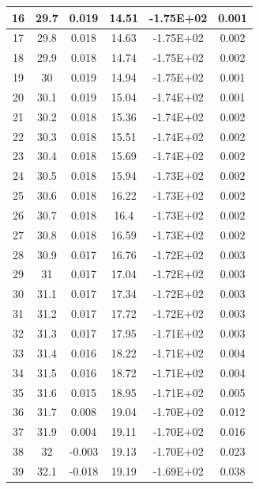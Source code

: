 \documentclass{THUexprep}
\begin{document}
\begin{longtable}{|c|c|c|c|c|c|}
    \hline
    16    & 29.7  & 0.019 & 14.51 & -1.75E+02 & 0.001 \\
    \hline
    17    & 29.8  & 0.018 & 14.63 & -1.75E+02 & 0.002 \\
    \hline
    18    & 29.9  & 0.018 & 14.74 & -1.75E+02 & 0.002 \\
    \hline
    19    & 30    & 0.019 & 14.94 & -1.75E+02 & 0.001 \\
    \hline
    20    & 30.1  & 0.019 & 15.04 & -1.74E+02 & 0.001 \\
    \hline
    21    & 30.2  & 0.018 & 15.36 & -1.74E+02 & 0.002 \\
    \hline
    22    & 30.3  & 0.018 & 15.51 & -1.74E+02 & 0.002 \\
    \hline
    23    & 30.4  & 0.018 & 15.69 & -1.74E+02 & 0.002 \\
    \hline
    24    & 30.5  & 0.018 & 15.94 & -1.73E+02 & 0.002 \\
    \hline
    25    & 30.6  & 0.018 & 16.22 & -1.73E+02 & 0.002 \\
    \hline
    26    & 30.7  & 0.018 & 16.4  & -1.73E+02 & 0.002 \\
    \hline
    27    & 30.8  & 0.018 & 16.59 & -1.73E+02 & 0.002 \\
    \hline
    28    & 30.9  & 0.017 & 16.76 & -1.72E+02 & 0.003 \\
    \hline
    29    & 31    & 0.017 & 17.04 & -1.72E+02 & 0.003 \\
    \hline
    30    & 31.1  & 0.017 & 17.34 & -1.72E+02 & 0.003 \\
    \hline
    31    & 31.2  & 0.017 & 17.72 & -1.72E+02 & 0.003 \\
    \hline
    32    & 31.3  & 0.017 & 17.95 & -1.71E+02 & 0.003 \\
    \hline
    33    & 31.4  & 0.016 & 18.22 & -1.71E+02 & 0.004 \\
    \hline
    34    & 31.5  & 0.016 & 18.72 & -1.71E+02 & 0.004 \\
    \hline
    35    & 31.6  & 0.015 & 18.95 & -1.71E+02 & 0.005 \\
    \hline
    36    & 31.7  & 0.008 & 19.04 & -1.70E+02 & 0.012 \\
    \hline
    37    & 31.9  & 0.004 & 19.11 & -1.70E+02 & 0.016 \\
    \hline
    38    & 32    & -0.003 & 19.13 & -1.70E+02 & 0.023 \\
    \hline
    39    & 32.1  & -0.018 & 19.19 & -1.69E+02 & 0.038 \\
    \hline

\end{longtable}
\end{document}
